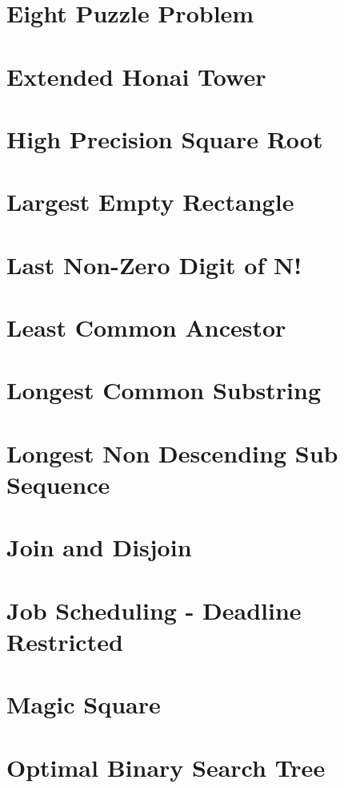 \documentclass{report}
\begin{document}
\begin{CJK*}{GBK}{kai}
\section{Eight Puzzle Problem}

\clearpage
\section{Extended Honai Tower}

\section{High Precision Square Root}

\section{Largest Empty Rectangle}

\section{Last Non-Zero Digit of N!}

\section{Least Common Ancestor}

\section{Longest Common Substring}

\clearpage
\section{Longest Non Descending Sub Sequence}

\section{Join and Disjoin}

\section{Job Scheduling - Deadline Restricted}

\clearpage
\section{Magic Square}

\clearpage
\section{Optimal Binary Search Tree}


\end{CJK*}
\end{document}
